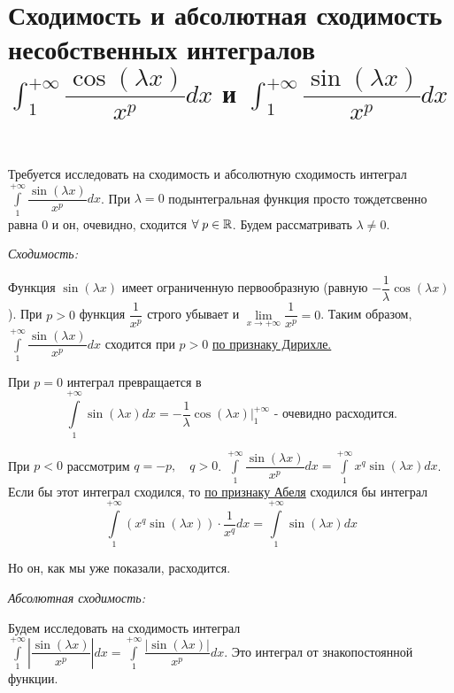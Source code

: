 \documentclass[../main.tex]{subfiles}
\begin{document}
\newpage
\section{Сходимость и абсолютная сходимость несобственных интегралов \( \int_{ 1}^{ + \infty} \dfrac{ \cos\left(\lambda x\right)}{ x^p}dx\) и \( \int_{ 1}^{ + \infty} \dfrac{ \sin\left(\lambda x\right)}{ x^p}dx\)}
\hypertarget{ex:converge_sin}{~}
Требуется исследовать на сходимость и абсолютную сходимость интеграл \( \displaystyle\int\limits_{ 1}^{ + \infty } \dfrac{ \sin( \lambda x)}{ x^p} dx\). 
При \( \lambda =0\) подынтегральная функция просто тождетсвенно равна 0 и он, очевидно, сходится \( \forall \; p \in \mathbb{R} \). Будем рассматривать \( \lambda \neq 0\).

\emph{Сходимость:}

Функция \( \sin\left( \lambda x\right)\) имеет ограниченную первообразную (равную \( - \dfrac{ 1}{ \lambda } \cos\left( \lambda x\right)\)). При \( p > 0\) функция 
\( \dfrac{ 1}{ x^p}\) строго убывает и \( \lim\limits_{ x \rightarrow + \infty } \dfrac{ 1}{ x^p} =0\). Таким образом, \( \displaystyle\int\limits_{ 1}^{ + \infty } \dfrac{ \sin\left(\lambda x\right)}{ x^p}dx \) сходится при \( p > 0\) \hyperlink{thm:int_dirihle}{по признаку Дирихле.} 

При \( p=0\) интеграл превращается в 
\[ \displaystyle\int\limits_{ 1}^{ + \infty } \sin\left( \lambda x\right)dx= - \dfrac{ 1}{ \lambda } \cos \left( \lambda x\right)\bigg|_1^{+ \infty } \text{ - очевидно расходится.}\]

При \( p < 0\) рассмотрим \( q=-p,\quad q>0\). \( \displaystyle\int\limits_{ 1}^{ + \infty } \dfrac{ \sin\left( \lambda x\right)}{ x^p} dx= \displaystyle\int\limits_{ 1}^{ + \infty } x^q\sin\left(\lambda x\right)dx\). Если бы этот интеграл сходился, то \hyperlink{thm:int_abel}{по признаку Абеля} сходился бы интеграл
\[ \displaystyle\int\limits_{ 1}^{ + \infty } \left( x^q\sin\left( \lambda x\right)\right) \cdot  \dfrac{ 1}{ x^q} dx= \displaystyle\int\limits_{ 1}^{ + \infty } \sin\left( \lambda x\right)dx\]

Но он, как мы уже показали, расходится. 

\emph{Абсолютная сходимость:}

Будем исследовать на сходимость интеграл \( \displaystyle\int\limits_{ 1}^{ + \infty } \left| \dfrac{ \sin \left( \lambda x\right)}{ x^p} \right|dx= \displaystyle\int\limits_{ 1}^{ + \infty } \dfrac{ \left|\sin\left(\lambda x\right)\right|}{ x^p} dx\). Это интеграл от знакопостоянной функции. 
\end{document}
